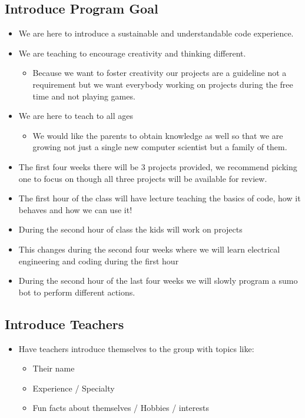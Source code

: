 \documentclass[12pt]{article}
\begin{document}
\subsection*{Introduce Program Goal}
	\begin{itemize}
		\item We are here to introduce a sustainable and understandable code experience.
		\item We are teaching to encourage creativity and thinking different.
		\begin{itemize}
			\item Because we want to foster creativity our projects are a guideline not a requirement but we want everybody working on projects during the free time and not playing games.
		\end{itemize}
		\item We are here to teach to all ages
		\begin{itemize}
			\item We would like the parents to obtain knowledge as well so that we are growing not just a single new computer scientist but a family of them.
		\end{itemize}
		\item The first four weeks there will be 3 projects provided, we recommend picking one to focus on though all three projects will be available for review.
		\item The first hour of the class will have lecture teaching the basics of code, how it behaves and how we can use it!
		\item During the second hour of class the kids will work on projects
		\item This changes during the second four weeks where we will learn electrical engineering and coding during the first hour
		\item During the second hour of the last four weeks we will slowly program a sumo bot to perform different actions.
	\end{itemize}



\subsection*{Introduce Teachers}
	\begin{itemize}
		\item Have teachers introduce themselves to the group with topics like:
		\begin{itemize}
			\item Their name
			\item Experience / Specialty
			\item Fun facts about themselves / Hobbies / interests
		\end{itemize}
	\end{itemize}
\end{document}
